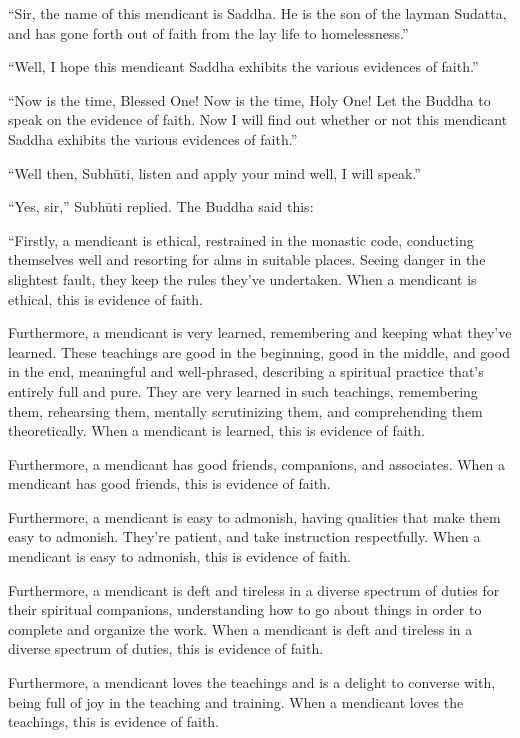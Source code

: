 \documentclass[12pt,openany]{book}%
\begin{document}
“Sir, the name of this mendicant is Saddha. He is the son of the layman Sudatta, and has gone forth out of faith from the lay life to homelessness.” 

“Well, I hope this mendicant Saddha exhibits the various evidences of faith.” 

“Now is the time, Blessed One! Now is the time, Holy One! Let the Buddha to speak on the evidence of faith. Now I will find out whether or not this mendicant Saddha exhibits the various evidences of faith.” 

“Well then, \textsanskrit{Subhūti}, listen and apply your mind well, I will speak.” 

“Yes, sir,” \textsanskrit{Subhūti} replied. The Buddha said this: 

“Firstly, a mendicant is ethical, restrained in the monastic code, conducting themselves well and resorting for alms in suitable places. Seeing danger in the slightest fault, they keep the rules they’ve undertaken. When a mendicant is ethical, this is evidence of faith. 

Furthermore, a mendicant is very learned, remembering and keeping what they’ve learned. These teachings are good in the beginning, good in the middle, and good in the end, meaningful and well-phrased, describing a spiritual practice that’s entirely full and pure. They are very learned in such teachings, remembering them, rehearsing them, mentally scrutinizing them, and comprehending them theoretically. When a mendicant is learned, this is evidence of faith. 

Furthermore, a mendicant has good friends, companions, and associates. When a mendicant has good friends, this is evidence of faith. 

Furthermore, a mendicant is easy to admonish, having qualities that make them easy to admonish. They’re patient, and take instruction respectfully. When a mendicant is easy to admonish, this is evidence of faith. 

Furthermore, a mendicant is deft and tireless in a diverse spectrum of duties for their spiritual companions, understanding how to go about things in order to complete and organize the work. When a mendicant is deft and tireless in a diverse spectrum of duties, this is evidence of faith. 

Furthermore, a mendicant loves the teachings and is a delight to converse with, being full of joy in the teaching and training. When a mendicant loves the teachings, this is evidence of faith. 
\end{document}
